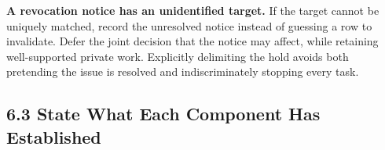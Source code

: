 \documentclass[10pt,a4paper]{article}
\newlength{\usable}
\begin{document}
\textbf{A revocation notice has an unidentified target.} If the target cannot be uniquely matched, record the unresolved notice instead of guessing a row to invalidate. Defer the joint decision that the notice may affect, while retaining well-supported private work. Explicitly delimiting the hold avoids both pretending the issue is resolved and indiscriminately stopping every task.

\subsection{6.3 State What Each Component Has Established}\label{two-role-failure-design-state-what-each-component-has-established}

\Needspace{115pt}
\begingroup\fontsize{9.1}{12}\selectfont\setlength{\parskip}{1pt}
\setlength{\usable}{\dimexpr\linewidth-4\tabcolsep\relax}
\end{document}
